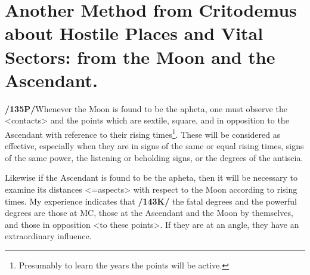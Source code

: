 \section{Another Method from Critodemus about Hostile Places and Vital Sectors: from the Moon and the Ascendant.}

\textbf{/135P/}Whenever the Moon is found to be the apheta, one must observe the <contacts> and the points which are sextile, square, and in opposition to the Ascendant with reference to their rising times\footnote{Presumably to learn the years the points will be active.}. These will be considered as effective, especially when they are in signs of the same or equal rising times, signs of the same power, the listening or beholding signs, or the degrees of the antiscia. 

Likewise if the Ascendant is found to be the apheta, then it will be necessary to examine its distances <=aspects> with respect to the Moon according to rising times. My experience indicates that \textbf{/143K/} the fatal degrees and the powerful degrees are those at MC, those at the Ascendant and the Moon by themselves, and those in opposition <to these points>. If they are at an angle, they have an extraordinary influence.

\newpage